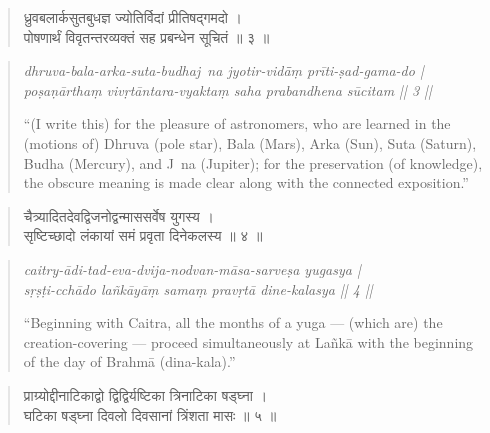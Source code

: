 \documentclass[11pt,a4paper]{article}
\newcommand{\dev}[1]{{\devanagarifont #1}}
\theoremstyle{definition}
\begin{document}
\vspace{0.3cm}



\noindent
\begin{quote}
\dev{ध्रुवबलार्कसुतबुधज्ञ ज्योतिर्विदां प्रीतिषद्गमदो ।\\
पोषणार्थं विवृतन्तरव्यक्तं सह प्रबन्धेन सूचितं ॥ ३ ॥}
\end{quote}

\hfill\noindent
\begin{quote}
\textit{dhruva-bala-arka-suta-budhaj~na jyotir-vid\=\=a\d{m} pr\={i}ti-\d{s}ad-gama-do |\\
po\d{s}a\d{n}\=artha\d{m} viv\d{r}t\=antara-vyakta\d{m} saha prabandhena s\=ucitam || 3 ||}

``(I write this) for the pleasure of astronomers, who are learned in the (motions of) Dhruva (pole star), Bala (Mars), Arka (Sun), Suta (Saturn), Budha (Mercury), and J~na (Jupiter); for the preservation (of knowledge), the obscure meaning is made clear along with the connected exposition.''
\end{quote}



\vspace{0.3cm}



\noindent
\begin{quote}
\dev{चैत्र्यादितदेवद्विजनोद्वन्माससर्वेष युगस्य ।\\
सृष्टिच्छादो लंकायां समं प्रवृता दिनेकलस्य ॥ ४ ॥}
\end{quote}

\hfill\noindent
\begin{quote}
\textit{caitry-\=adi-tad-eva-dvija-nodvan-m\=asa-sarve\d{s}a yugasya |\\
s\d{r}\d{s}\d{t}i-cch\=ado la\~nk\=ay\=a\d{m} sama\d{m} prav\d{r}t\=a dine-kalasya || 4 ||}

``Beginning with Caitra, all the months of a yuga --- (which are) the creation-covering --- proceed simultaneously at La\~nk\=a with the beginning of the day of Brahm\=a (dina-kala).''
\end{quote}



\vspace{0.3cm}



\noindent
\begin{quote}
\dev{प्राग्र्योद्दीनाटिकाद्वो द्विद्विर्यष्टिका त्रिनाटिका षड्घ्ना ।\\
घटिका षड्घ्ना दिवलो दिवसानां त्रिंशता मासः ॥ ५ ॥}
\end{quote}
\end{document}
